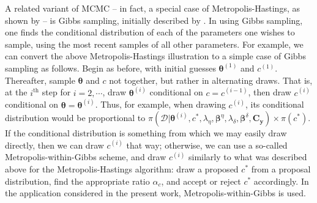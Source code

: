\documentclass{article}
\begin{document}
A related variant of MCMC -- in fact, a special case of Metropolis-Hastings, as shown by \cite{Gelman1992} -- is Gibbs sampling, initially described by \cite{Geman1984}. In using Gibbs sampling, one finds the conditional distribution of each of the parameters one wishes to sample, using the most recent samples of all other parameters. For example, we can convert the above Metropolis-Hastings illustration to a simple case of Gibbs sampling as follows.
Begin as before, with initial guesses $\boldsymbol \theta^{(1)}$ and $c^{(1)}$. Thereafter, sample $\boldsymbol \theta$ and $c$ not together, but rather in alternating draws. That is, at the $i^{\text{th} }$ step for $i=2,\cdots$, draw $\boldsymbol \theta^{(i)}$ conditional on $c=c^{(i-1)}$, then draw $c^{(i)}$ conditional on $\boldsymbol \theta=\boldsymbol \theta^{(i)}$. Thus, for example, when drawing $c^{(i)}$, its conditional distribution would be proportional to $\pi(\mathcal D | \boldsymbol \theta^{(i)},c^{*},\lambda_\eta, \boldsymbol \beta^\eta,\lambda_\delta,\boldsymbol \beta^\delta,\mathbf C_{\mathbf y}) \times \pi(c^{*})$. 
If the conditional distribution is something from which we may easily draw directly, then we can draw $c^{(i)}$ that way; otherwise, we can use a so-called Metropolis-within-Gibbs scheme, and draw $c^{(i)}$ similarly to what was described above for the Metropolis-Hastings algorithm: draw a proposed $c^*$ from a proposal distribution, find the appropriate ratio $\alpha_c$, and accept or reject $c^*$ accordingly. In the application considered in the present work, Metropolis-within-Gibbs is used.

\end{document}
